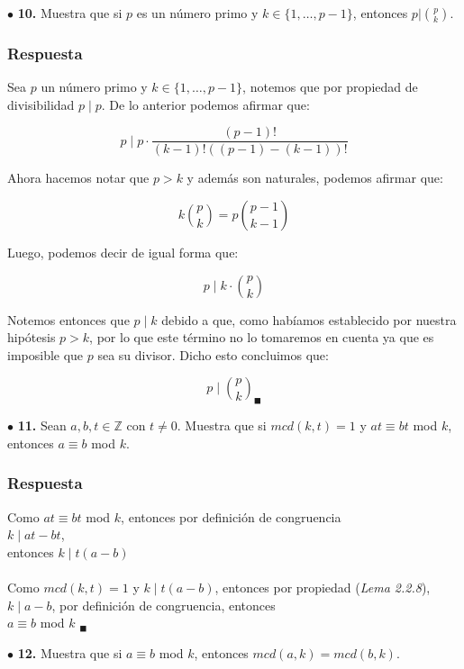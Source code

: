 \documentclass[12pt]{article}
\begin{document}
	$\bullet$ \textbf{10.} Muestra que si $p$ es un número primo y $k \in \{1, \dots, p-1 \}$, entonces $p | \binom{p}{k}$.
	
	\subsubsection*{Respuesta}
	Sea $p$ un número primo y $k \in \{1, \ldots, p - 1\}$, notemos que por propiedad de divisibilidad $p \mid p$. De lo anterior podemos afirmar que:
	
	\[ p \mid p \cdot \frac{(p - 1)!}{(k - 1)!((p-1) - (k-1))!} \]
	
	Ahora hacemos notar que $p > k$ y además son naturales, podemos afirmar que:
	
	\[ k \binom{p}{k} = p \binom{p-1}{k-1} \]
	
	Luego, podemos decir de igual forma que:
	
	\[ p \mid k \cdot \binom{p}{k} \]
	
	Notemos entonces que $p \mid k$ debido a que, como habíamos establecido por nuestra hipótesis $p > k$, por lo que este término no lo tomaremos en cuenta ya que es imposible que $p$ sea su divisor. Dicho esto concluimos que:
	
	\[ p \mid \binom{p}{k} _\blacksquare\]
	
	\vspace{1cm}
	$\bullet$ \textbf{11.} Sean $a, b, t \in \mathbb{Z}$ con $t \neq 0$. Muestra que si $mcd(k, t) = 1$ y $at \equiv bt$ mod $k$, entonces $a \equiv b$ mod $k$.
	
	\subsubsection*{Respuesta}
	Como $at \equiv bt$ mod $k$, entonces por definición de congruencia \\
	$k \mid at - bt$, \\
	entonces $k \mid t (a-b)$\\
	\\
	Como $mcd(k,t)=1$ y $k \mid t (a-b)$, entonces por propiedad (\textit {Lema 2.2.8}), \\
	$k \mid a-b$, por definición de congruencia, entonces\\
	$a \equiv b$ mod $k$ $_\blacksquare$
	
	\vspace{1cm}
	$\bullet$ \textbf{12.} Muestra que si $a \equiv b$ mod $k$, entonces $mcd(a, k) = mcd(b, k)$.
	
\end{document}
